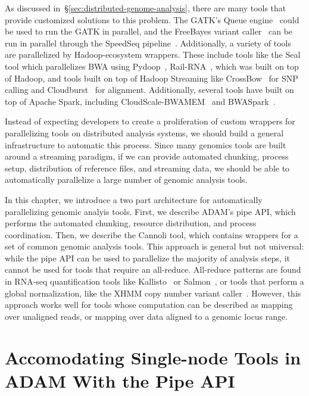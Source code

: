 \documentclass[phd]{ucbthesis}
\begin{document}
As discussed in~\S\ref{sec:distributed-genome-analysis}, there are many tools
that provide customized solutions to this problem. The GATK's {Queue}
engine~\cite{depristo11} could be used to run the GATK in parallel, and the
{FreeBayes} variant caller~\cite{garrison12} can be run in parallel
through the {SpeedSeq} pipeline~\cite{chiang15}. Additionally, a variety
of tools are parallelized by {Hadoop}-ecosystem wrappers. These include
tools like the {Seal} tool which parallelizes {BWA} using
{Pydoop}~\cite{leo10, pireddu11}, {Rail-RNA}~\cite{nellore16},
which was built on top of {Hadoop}, and tools built on top of
{Hadoop Streaming} like {CrossBow}~\cite{langmead09crossbow} for
SNP calling and {Cloudburst}~\cite{schatz09} for alignment.
Additionally, several tools have built on top of {Apache Spark},
including {CloudScale-BWAMEM}~\cite{chen16} and
{BWASpark}~\cite{abuin16}.

Instead of expecting developers to create a proliferation of custom wrappers for
parallelizing tools on distributed analysis systems, we should build
a general infrastructure to automatic this process. Since many genomics tools
are built around a streaming paradigm, if we can provide automated chunking,
process setup, distribution of reference files, and streaming data, we should
be able to automatically parallelize a large number of genomic analysis tools.

In this chapter, we introduce a two part architecture for automatically
parallelizing genomic analyis tools. First, we describe ADAM's {pipe}
API, which performs the automated chunking, resource distribution, and process
coordination. Then, we describe the {Cannoli} tool, which contains
wrappers for a set of common genomic analysis tools. This approach is general
but not universal: while the {pipe} API can be used to parallelize the
majority of analysis steps, it cannot be used for tools that require an
all-reduce. All-reduce patterns are found in RNA-seq quantification tools like
{Kallisto}~\cite{bray16} or {Salmon}~\cite{patro17}, or tools
that perform a global normalization, like the XHMM copy number variant
caller~\cite{fromer12}. However, this approach works well for tools whose
computation can be described as mapping over unaligned reads, or mapping over
data aligned to a genomic locus range.

\section{Accomodating Single-node Tools in {ADAM} With the {Pipe} API}
\label{sec:pipe-api}
\end{document}
